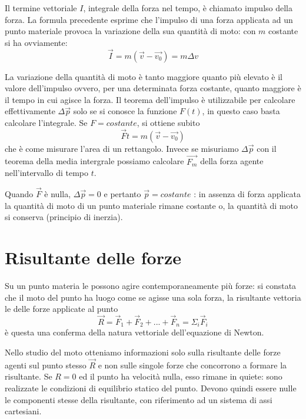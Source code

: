 \documentclass[class=book, crop=false, oneside, 12pt]{standalone}
\begin{document}
Il termine vettoriale \(I\), integrale della forza nel tempo, è chiamato impulso della forza. 
La formula precedente esprime che l'impulso di una forza applicata ad un punto materiale provoca la variazione della sua quantità di moto: con \(m\) costante si ha ovviamente:
\begin{equation}
    \overrightarrow{I} = m (\overrightarrow{v} - \overrightarrow{v_0}) = m \Delta v
\end{equation}

La variazione della quantità di moto è tanto maggiore quanto più elevato è il valore dell'impulso ovvero, per una determinata forza costante, quanto maggiore è il tempo in cui agisce la forza.
Il teorema dell'impulso è utilizzabile per calcolare effettivamente \(\Delta \overrightarrow{p}\) solo se si conosce la funzione \(F (t)\), in questo caso basta calcolare l'integrale.
Se \(F = costante\), si ottiene subito
\begin{equation}
    \overrightarrow{F} t = m (\overrightarrow{v} - \overrightarrow{v_0})
\end{equation}
che è come misurare l'area di un rettangolo.
Invece se misuriamo \(\Delta \overrightarrow{p}\) con il teorema della media intergrale possiamo calcolare \(\overrightarrow{F_m}\) della forza agente nell'intervallo di tempo \(t\).

Quando \(\overrightarrow{F}\) è nulla, \(\Delta \overrightarrow{p} = 0\) e pertanto \(\overrightarrow{p} = costante\) : in assenza di forza applicata la quantità di moto di un punto materiale rimane costante o, la quantità di moto si conserva (principio di inerzia). 

\section{Risultante delle forze}
Su un punto materia le possono agire contemporaneamente più forze: si constata che il moto del punto ha luogo come se agisse una sola forza, 
la risultante vettoria le delle forze applicate al punto
\begin{equation}
    \overrightarrow{R} = \overrightarrow{F}_1+\overrightarrow{F}_2+ ... + \overrightarrow{F}_n = \Sigma_i \overrightarrow{F}_i
\end{equation}
è questa una conferma della natura vettoriale dell'equazione di Newton.

Nello studio del moto otteniamo informazioni solo sulla risultante delle forze agenti sul punto stesso \(\overrightarrow{R}\) e non sulle singole forze che concorrono a formare la risultante.
Se \(R = 0\) ed il punto ha velocità nulla, esso rimane in quiete: sono realizzate le condizioni di equilibrio statico del punto. 
Devono quindi essere nulle le componenti stesse della risultante, con riferimento ad un sistema di assi cartesiani.
\end{document}
